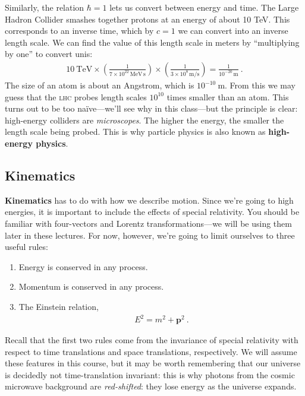 \documentclass[12pt]{article}
\numberwithin{equation}{section}    %
\newcommand{\acro}[1]{\textsc{\MakeLowercase{#1}}}
\renewcommand{\vec}[1]{\mathbf{#1}} %
\begin{document}
Similarly, the relation $\hbar = 1$ lets us convert between energy and time. The Large Hadron Collider smashes together protons at an energy of about 10 TeV. This corresponds to an inverse time, which by $c=1$ we can convert into an inverse length scale. We can find the value of this length scale in meters by ``multiplying by one'' to convert unis:
\begin{align}
	10~\text{TeV} \times
	\left(\frac{1}{7\times 10^{22}\,\text{MeV}\,\text{s}}\right)
	\times\left(\frac{1}{3\times 10^{8}\,\text{m}/\text{s}}\right)
	= 
	\frac{1}{10^{-20}\,\text{m}} \ .
\end{align}
The size of an atom is about an Angstrom, which is $10^{-10}~$m. From this we may guess that the \acro{LHC} probes length scales $10^{10}$ times smaller than an atom. This turns out to be too na\"ive---we'll see why in this class---but the principle is clear: high-energy colliders are \emph{microscopes}. The higher the energy, the smaller the length scale being probed. This is why particle physics is also known as \textbf{high-energy physics}. 

\subsection{Kinematics}

\textbf{Kinematics} has to do with how we describe motion. Since we're going to high energies, it is important to include the effects of special relativity. You should be familiar with four-vectors and Lorentz transformations---we will be using them later in these lectures. For now, however, we're going to limit ourselves to three useful rules:
\begin{enumerate}
	\item Energy is conserved in any process.
	\item Momentum is conserved in any process.
	\item The Einstein relation,
\begin{align}
	E^2 = m^2 + \vec{p}^2 \ .
\end{align}
\end{enumerate}
%
Recall that the first two rules come from the invariance of special relativity with respect to time translations and space translations, respectively. We will assume these features in this course, but it may be worth remembering that our universe is decidedly not time-translation invariant: this is why photons from the cosmic microwave background are \emph{red-shifted}: they lose energy as the universe expands.
\end{document}

